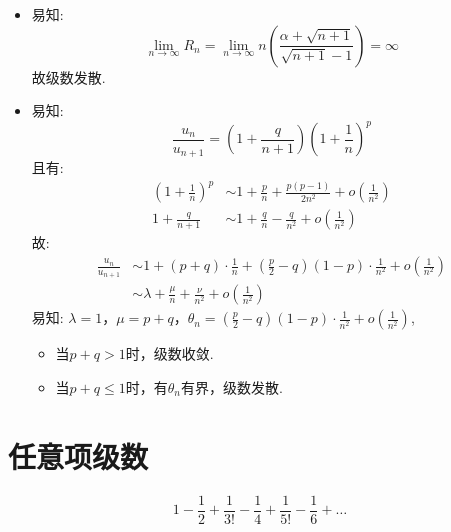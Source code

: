 \begin{solution}
    \begin{itemize}
        \item 易知: \[
                \lim_{n \to \infty} R_{n}=\lim_{n \to \infty} n\left(
                    \frac{\alpha+\sqrt{n+1}}{\sqrt{n+1}-1}
                \right)= \infty
            \]
            故级数发散.
        \item 易知: \[
                \frac{u_{n}}{u_{n+1}}= \left(
                1+\frac{q}{n+1} \right)\left(
                1+\frac{1}{n} \right)^{p}
            \]
            且有:
            \begin{align}
                \left( 1+\frac{1}{n} \right)^{p} & \sim 1+
                \frac{p}{n}+
                \frac{p(p-1)}{2n^{2}} + o(\frac{1}{n^{2}})
                \\
                1 + \frac{q}{n+1}                & \sim
                1+\frac{q}{n}-\frac{q}{n^{2}}+o(\frac{1}{n^{2}})
            \end{align}
            故:
            \begin{align*}
                \frac{u_{n}}{u_{n+1}} & \sim  1+(p+q)\cdot
                \frac{1}{n}+\left(
                \frac{p}{2}-q \right)\left( 1-p\right) \cdot
                \frac{1}{n^{2}}+o(\frac{1}{n^{2}})
                \\
                & \sim \lambda + \frac{\mu}{n} + \frac{\nu}{n^{2}} +
                o(\frac{1}{n^{2}})
            \end{align*}
            易知: \(\lambda = 1\)，\(\mu = p+q\)，\(\theta_{n} =
                \left(\frac{p}{2}-q
                \right)\left(
            1-p\right)\cdot\frac{1}{n^{2}}+o(\frac{1}{n^{2}})\),
            \begin{itemize}
                \item 当\(p+q > 1\)时，级数收敛.
                \item 当\(p+q \le 1\)时，有\(\theta_n\)有界，级数发散.
            \end{itemize}
    \end{itemize}

\end{solution}
\section{任意项级数}
\[
    1 - \frac{1}{2} + \frac{1}{3!} - \frac{1}{4} + \frac{1}{5!} -
    \frac{1}{6} + \dots
\]

